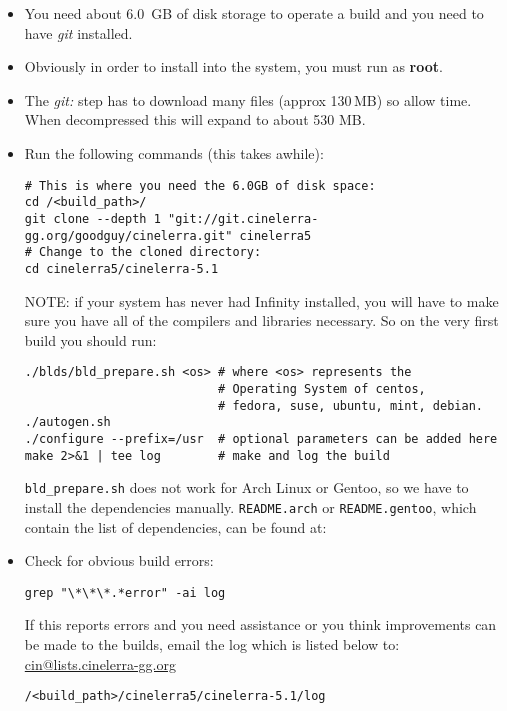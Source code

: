 \begin{itemize}
\item You need about 6.0 \,GB of disk storage to operate a build and
  you need to have \textit{git} installed.

\item Obviously in order to install into the system, you must run as
  \textbf{root}.

\item The \textit{git:} step has to download many files (approx
  130\,MB) so allow time. When decompressed this will expand to
  about 530 MB.

\item Run the following commands (this takes awhile):

\begin{lstlisting}[style=sh]
# This is where you need the 6.0GB of disk space:
cd /<build_path>/
git clone --depth 1 "git://git.cinelerra-gg.org/goodguy/cinelerra.git" cinelerra5
# Change to the cloned directory:
cd cinelerra5/cinelerra-5.1
\end{lstlisting}
  NOTE: if your system has never had \CGG{} Infinity installed, you
  will have to make sure you have all of the compilers and libraries
  necessary.  So on the very first build you should run:

\begin{lstlisting}[style=sh]
./blds/bld_prepare.sh <os> # where <os> represents the
                           # Operating System of centos,
                           # fedora, suse, ubuntu, mint, debian.
./autogen.sh
./configure --prefix=/usr  # optional parameters can be added here
make 2>&1 | tee log        # make and log the build
\end{lstlisting}

  \texttt{bld\_prepare.sh} does not work for Arch Linux or Gentoo,
  so we have to install the dependencies
  manually. \texttt{README.arch} or \texttt{README.gentoo}, which
  contain the list of dependencies, can be found at:

\item Check for obvious build errors:
\begin{lstlisting}[style=sh]
grep "\*\*\*.*error" -ai log
\end{lstlisting}
  If this reports errors and you need assistance or you think
  improvements can be made to the builds, email the log which is
  listed below to:
  \href{mailto:cin@lists.cinelerra-gg.org}{cin@lists.cinelerra-gg.org}
\begin{lstlisting}[style=sh]
/<build_path>/cinelerra5/cinelerra-5.1/log
\end{lstlisting}


\end{itemize}

